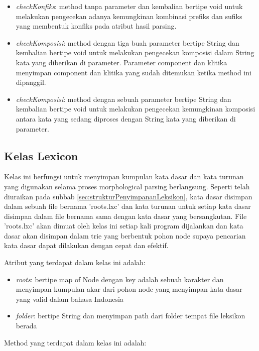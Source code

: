 \begin{itemize}
	\item \textit{checkKonfiks}: method tanpa parameter dan kembalian bertipe void untuk melakukan pengecekan adanya kemungkinan kombinasi prefiks dan sufiks yang membentuk konfiks pada atribut hasil parsing.
	\item \textit{checkKomposisi}: method dengan tiga buah parameter bertipe String dan kembalian bertipe void untuk melakukan pengecekan komposisi dalam String kata yang diberikan di parameter. Parameter component dan klitika menyimpan component dan klitika yang sudah ditemukan ketika method ini dipanggil.
	\item \textit{checkKomposisi}: method dengan sebuah parameter bertipe String dan kembalian bertipe void untuk melakukan pengecekan kemungkinan komposisi antara kata yang sedang diproses dengan String kata yang diberikan di parameter.
\end{itemize}

\subsection{Kelas Lexicon}
\label{sec:kelasLexicon}

Kelas ini berfungsi untuk menyimpan kumpulan kata dasar dan kata turunan yang digunakan selama proses morphological parsing berlangsung. Seperti telah diuraikan pada subbab \ref{sec:strukturPenyimpananLeksikon}, kata dasar disimpan dalam sebuah file bernama 'roots.lxc' dan kata turunan untuk setiap kata dasar disimpan dalam file bernama sama dengan kata dasar yang bersangkutan. File 'roots.lxc' akan dimuat oleh kelas ini setiap kali program dijalankan dan kata dasar akan disimpan dalam trie yang berbentuk pohon node supaya pencarian kata dasar dapat dilakukan dengan cepat dan efektif.

Atribut yang terdapat dalam kelas ini adalah:

\begin{itemize}
	\item \textit{roots}: bertipe map of Node dengan key adalah sebuah karakter dan menyimpan kumpulan akar dari pohon node yang menyimpan kata dasar yang valid dalam bahasa Indonesia
	\item \textit{folder}: bertipe String dan menyimpan path dari folder tempat file leksikon berada
\end{itemize}

Method yang terdapat dalam kelas ini adalah:

